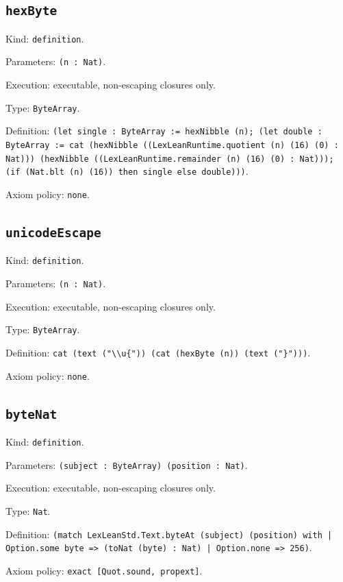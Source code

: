 \documentclass[11pt]{article}
\begin{document}
\subsection*{\texttt{hexByte}}
\noindent Kind: \texttt{definition}.\par
\noindent Parameters: \texttt{(n : Nat)}.\par
\noindent Execution: executable, non-escaping closures only.\par
\noindent Type: \texttt{ByteArray}.\par
\noindent Definition: \texttt{(let single : ByteArray := hexNibble (n); (let double : ByteArray := cat (hexNibble ((LexLeanRuntime.quotient (n) (16) (0) : Nat))) (hexNibble ((LexLeanRuntime.remainder (n) (16) (0) : Nat))); (if (Nat.blt (n) (16)) then single else double)))}.\par
\noindent Axiom policy: \texttt{none}.\par
\subsection*{\texttt{unicodeEscape}}
\noindent Kind: \texttt{definition}.\par
\noindent Parameters: \texttt{(n : Nat)}.\par
\noindent Execution: executable, non-escaping closures only.\par
\noindent Type: \texttt{ByteArray}.\par
\noindent Definition: \texttt{cat (text ("\textbackslash{}\textbackslash{}u\{")) (cat (hexByte (n)) (text ("\}")))}.\par
\noindent Axiom policy: \texttt{none}.\par
\subsection*{\texttt{byteNat}}
\noindent Kind: \texttt{definition}.\par
\noindent Parameters: \texttt{(subject : ByteArray) (position : Nat)}.\par
\noindent Execution: executable, non-escaping closures only.\par
\noindent Type: \texttt{Nat}.\par
\noindent Definition: \texttt{(match LexLeanStd.Text.byteAt (subject) (position) with | Option.some byte => (toNat (byte) : Nat) | Option.none => 256)}.\par
\noindent Axiom policy: \texttt{exact [Quot.sound, propext]}.\par
\end{document}

